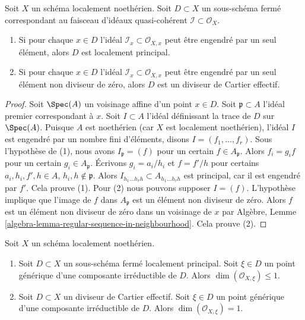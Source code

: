 \begin{lemma}
\label{lemma-effective-Cartier-in-points}
Soit  $X$  un schéma localement noethérien. Soit  $D \subset X$  un
sous-schéma fermé correspondant au faisceau d'idéaux quasi-cohérent  $\mathcal{I} \subset \mathcal{O}_X$.
\begin{enumerate}
\item Si pour chaque  $x \in D$  l'idéal  $\mathcal{I}_x \subset \mathcal{O}_{X, x}$  peut être engendré par un seul
élément, alors  $D$  est localement principal.
\item Si pour chaque  $x \in D$  l'idéal  $\mathcal{I}_x \subset \mathcal{O}_{X, x}$  peut être engendré par un seul
élément non diviseur de zéro, alors  $D$  est un diviseur de Cartier
effectif.
\end{enumerate}
\end{lemma}

\begin{proof}
Soit  $\Spec(A)$  un voisinage affine d'un point  $x \in D$. Soit  $\mathfrak p \subset A$ 
l'idéal premier correspondant à  $x$. Soit  $I \subset A$  l'idéal
définissant la trace de  $D$  sur  $\Spec(A)$. Puisque  $A$  est
noethérien (car  $X$  est localement noethérien), l'idéal  $I$  est
engendré par un nombre fini d'éléments, disons  $I = (f_1, \ldots, f_r)$. Sous l'hypothèse de
(1), nous avons  $I_\mathfrak p = (f)$  pour un certain  $f \in A_\mathfrak p$. Alors  $f_i = g_i f$  pour
un certain  $g_i \in A_\mathfrak p$. Écrivons  $g_i = a_i/h_i$  et  $f = f'/h$  pour certains
 $a_i, h_i, f', h \in A$,  $h_i, h \not \in \mathfrak p$. Alors  $I_{h_1 \ldots h_r h} \subset A_{h_1 \ldots h_r h}$  est principal, car il est engendré
par  $f'$. Cela prouve (1). Pour (2) nous pouvons supposer  $I = (f)$.
L'hypothèse implique que l'image de  $f$  dans  $A_\mathfrak p$  est un élément
non diviseur de zéro. Alors  $f$  est un élément non diviseur de zéro dans
un voisinage de  $x$  par Algèbre, Lemme  \ref{algebra-lemma-regular-sequence-in-neighbourhood}. Cela prouve (2).
\end{proof}

\begin{lemma}
\label{lemma-effective-Cartier-codimension-1}
Soit  $X$  un schéma localement noethérien.
\begin{enumerate}
\item Soit  $D \subset X$  un sous-schéma fermé localement principal. Soit  $\xi \in D$  un
point générique d'une composante irréductible de  $D$. Alors  $\dim(\mathcal{O}_{X, \xi}) \leq 1$.
\item Soit  $D \subset X$  un diviseur de Cartier effectif. Soit  $\xi \in D$  un point
générique d'une composante irréductible de  $D$. Alors  $\dim(\mathcal{O}_{X, \xi}) = 1$.
\end{enumerate}
\end{lemma}

